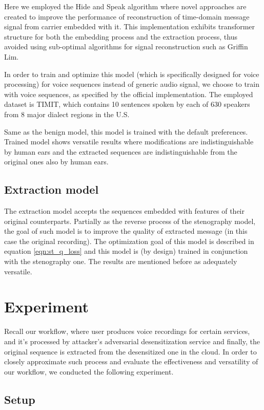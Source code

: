 \documentclass[journal]{IEEEtran} %
\begin{document}
Here we employed the Hide and Speak algorithm where novel approaches are created to improve the performance of reconstruction of time-domain message signal from carrier embedded with it. This implementation exhibits transformer structure for both the embedding process and the extraction process, thus avoided using sub-optimal algorithms for signal reconstruction such as Griffin Lim.

In order to train and optimize this model (which is specifically designed for voice processing) for voice sequences instead of generic audio signal, we choose to train with voice sequences, as specified by the official implementation. The employed dataset is TIMIT, which contains 10 sentences spoken by each of 630 speakers from 8 major dialect regions in the U.S.

Same as the benign model, this model is trained with the default preferences. Trained model shows versatile results where modifications are indistinguishable by human ears and the extracted sequences are indistinguishable from the original ones also by human ears.

\subsection{Extraction model}

The extraction model accepts the sequences embedded with features of their original counterparts. Partially as the reverse process of the stenography model, the goal of such model is to improve the quality of extracted message (in this case the original recording). The optimization goal of this model is described in equation \ref{eqn:st_q_loss} and this model is (by design) trained in conjunction with the stenography one. The results are mentioned before as adequately versatile.

\section{Experiment}

Recall our workflow, where user produces voice recordings for certain services, and it's processed by attacker's adversarial desensitization service and finally, the original sequence is extracted from the desensitized one in the cloud. In order to closely approximate such process and evaluate the effectiveness and versatility of our workflow, we conducted the following experiment.

\subsection{Setup}
\end{document}
